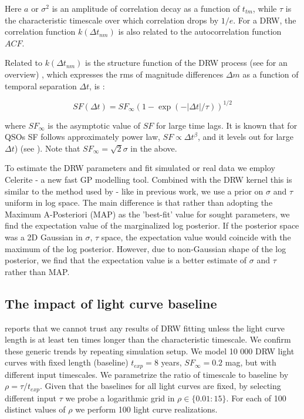 \documentclass[twocolumn]{aastex62}
\begin{document}
Here $a$ or $\sigma^{2}$ is an amplitude of correlation decay as a function of $t_{tm}$,  while $\tau$ is the characteristic timescale over which correlation drops by $1/e$. For a DRW,  the correlation function $k(\Delta t_{nm})$ is also related to the autocorrelation function $ACF$. 

Related to $k(\Delta t_{nm})$ is the   structure function of the DRW process (see \citet{macleod2012, bauer2009, graham2015a} for an overview) , which expresses the rms of  magnitude differences $\Delta m$ as a function of temporal separation $\Delta t$, is : 

\begin{equation}
SF(\Delta t) = SF_{\infty} (1-\exp{(-|\Delta t|/\tau)})^{1/2}
\end{equation}

where $SF_{\infty}$ is the asymptotic value of $SF$ for large time lags. It is known that for QSOs SF follows approximately power law, $SF \propto \Delta t^{\beta}$,  and it levels out for large $\Delta t$) (see \citet{macleod2012}).  Note that $SF_\infty = \sqrt{2} \sigma$  in the above. 


To estimate the  DRW  parameters and fit simulated or real data we employ Celerite - a new fast GP modelling tool\citep{foreman2017}. Combined with the DRW kernel this is similar to the method used by \citet{rybicki1992, kozlowski2010, macleod2010} - like in previous work, we use a  prior on $\sigma$ and $\tau$ uniform in log space.  The main difference is that rather than adopting the Maximum A-Posteriori (MAP) as the 'best-fit' value for sought parameters,  we find the expectation value of the marginalized log posterior. If the posterior space was a 2D Gaussian in $\sigma$, $\tau$ space, the expectation value would coincide with the maximum of the log posterior. However, due to non-Gaussian shape of the log posterior, we find that the expectation value is a better   estimate of $\sigma$ and $\tau$  rather than MAP. 

\subsection{The impact of light curve baseline}\label{sec:baseline}

\cite{kozlowski2017a}  reports that we cannot trust any results of DRW fitting unless the light curve length is at least ten times longer than the characteristic timescale. We confirm these generic trends by repeating \cite{kozlowski2017a} simulation setup. We  model 10 000  DRW light curves with fixed length (baseline) $t_{exp}=8$ years, $SF_{\infty} = 0.2$ mag,  but with different input timescales. We parametrize the ratio of timescale to baseline by $\rho = \tau / t_{exp}$. Given that the baselines for all light curves are fixed,  by selecting different input $\tau$ we probe a logarithmic grid in $\rho \in   \{ 0.01 : 15\}$. For each of  100 distinct values of $\rho$ we perform 100 light curve realizations.  
\end{document}
